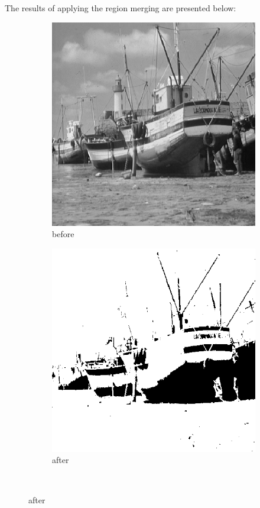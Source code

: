 \documentclass[12pt]{article}
\renewcommand{\subfiguresize}{.25\textwidth}
\begin{document}
The results of applying the region merging are presented below:

\begin{figure}[H]\centering
    \begin{subfigure}[t]{\subfiguresize}
        \includegraphics[width=\textwidth]{img/magda/boat.png}
        \caption{before}
    \end{subfigure}
    \hspace{2em}
    \begin{subfigure}[t]{\subfiguresize}
        \includegraphics[width=\textwidth]{img/magda/region_output.png}
        \caption{after}
    \end{subfigure}\\[2em]


\end{figure}
\end{document}
